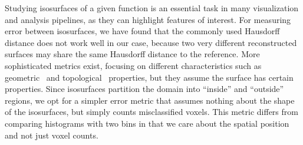 
Studying isosurfaces of a given function is an essential task in many visualization and analysis
pipelines, as they can highlight features of interest. For measuring error between isosurfaces, we
have found that the commonly used Hausdorff distance does not work well in our case, because two
very different reconstructed surfaces may share the same Hausdorff distance to the reference. More
sophisticated metrics exist, focusing on different characteristics such as
geometric~\cite{verifiable-isosurface} and topological~\cite{topology-verification-isosurface}
properties, but they assume the surface has certain properties. Since isosurfaces partition the
domain into ``inside'' and ``outside'' regions, we opt for a simpler error metric that assumes
nothing about the shape of the isosurfaces, but simply counts misclassified voxels. This metric
differs from comparing histograms with two bins in that we care about the spatial position and not
just voxel counts.

